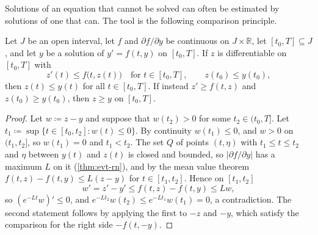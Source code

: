 Solutions of an equation that cannot be solved can often be estimated by solutions of one that can. The tool is the following comparison principle.

\begin{theorem}[Comparison]
\label{thm:comparison}
Let $J$ be an open interval, let $f$ and $\partial f/\partial y$ be continuous on $J\times\mathbb R$, let $[t_0,T]\subseteq J$, and let $y$ be a solution of $y'=f(t,y)$ on $[t_0,T]$. If $z$ is differentiable on $[t_0,T]$ with
\[
z'(t)\le f\bigl(t,z(t)\bigr)\quad\text{for }t\in[t_0,T],\qquad z(t_0)\le y(t_0),
\]
then $z(t)\le y(t)$ for all $t\in[t_0,T]$. If instead $z'\ge f(t,z)$ and $z(t_0)\ge y(t_0)$, then $z\ge y$ on $[t_0,T]$.
\end{theorem}

\begin{proof}
Let $w\coloneqq z-y$ and suppose that $w(t_2)>0$ for some $t_2\in(t_0,T]$. Let $t_1\coloneqq\sup\{t\in[t_0,t_2]:w(t)\le0\}$. By continuity $w(t_1)\le0$, and $w>0$ on $(t_1,t_2]$, so $w(t_1)=0$ and $t_1<t_2$. The set $Q$ of points $(t,\eta)$ with $t_1\le t\le t_2$ and $\eta$ between $y(t)$ and $z(t)$ is closed and bounded, so $|\partial f/\partial y|$ has a maximum $L$ on it (\cref{thm:evt-rn}), and by the mean value theorem $f(t,z)-f(t,y)\le L(z-y)$ for $t\in[t_1,t_2]$. Hence on $[t_1,t_2]$
\[
w'=z'-y'\le f(t,z)-f(t,y)\le Lw ,
\]
so $(e^{-Lt}w)'\le0$, and $e^{-Lt_2}w(t_2)\le e^{-Lt_1}w(t_1)=0$, a contradiction. The second statement follows by applying the first to $-z$ and $-y$, which satisfy the comparison for the right side $-f(t,-y)$.
\end{proof}


